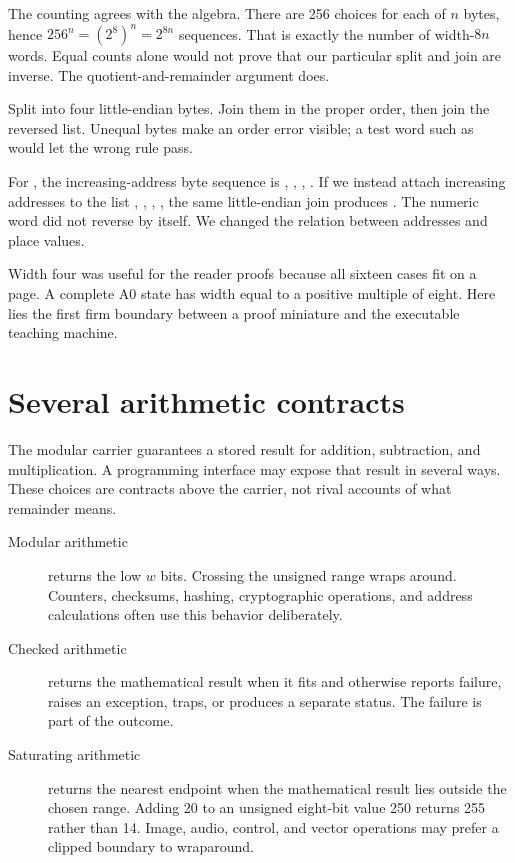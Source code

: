 The counting agrees with the algebra. There are 256 choices for each of
\(n\) bytes, hence \(256^n=(2^8)^n=2^{8n}\) sequences. That is exactly the
number of width-\(8n\) words. Equal counts alone would not prove that our
particular split and join are inverse. The quotient-and-remainder argument
does.

\begin{tryit}[title={A byte round trip with unequal digits}]
Split  into four little-endian bytes. Join them in the proper
order, then join the reversed list. Unequal bytes make an order error visible;
a test word such as  would let the wrong rule pass.
\end{tryit}

For , the increasing-address byte sequence is
, , , . If we instead attach increasing
addresses to the list , , , , the same
little-endian join produces . The numeric word did not
reverse by itself. We changed the relation between addresses and place values.

Width four was useful for the reader proofs because all sixteen cases fit on a
page. A complete A0 state has width equal to a positive multiple of eight.
Here lies the first firm boundary between a proof miniature and the executable
teaching machine.

\section{Several arithmetic contracts}

The modular carrier guarantees a stored result for addition, subtraction, and
multiplication. A programming interface may expose that result in several
ways. These choices are contracts above the carrier, not rival accounts of
what remainder means.

\begin{description}
\item[Modular arithmetic] returns the low \(w\) bits. Crossing the unsigned
range wraps around. Counters, checksums, hashing, cryptographic operations,
and address calculations often use this behavior deliberately.
\item[Checked arithmetic] returns the mathematical result when it fits and
otherwise reports failure, raises an exception, traps, or produces a separate
status. The failure is part of the outcome.
\item[Saturating arithmetic] returns the nearest endpoint when the
mathematical result lies outside the chosen range. Adding 20 to an unsigned
eight-bit value 250 returns 255 rather than 14. Image, audio, control, and
vector operations may prefer a clipped boundary to wraparound.
\end{description}

